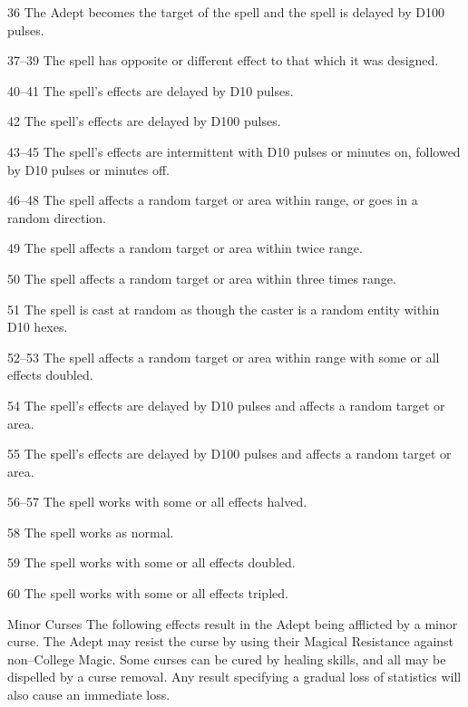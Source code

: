 \begin{multicols}{3}
\begin{Description}
\item[36] The Adept becomes the target of the spell and the spell is
delayed by D100 pulses.

\item[37--39] The spell has opposite or different effect to that which
it was designed.

\item[40--41] The spell's effects are delayed by D10 pulses.

\item[42] The spell's effects are delayed by D100 pulses.

\item[43--45] The spell's effects are intermittent with D10 pulses or
minutes on, followed by D10 pulses or minutes off.

\item[46--48] The spell affects a random target or area within range,
or goes in a random direction.

\item[49] The spell affects a random target or area within twice range.

\item[50] The spell affects a random target or area within three times
range.

\item[51] The spell is cast at random as though the caster is a random
entity within D10 hexes.

\item[52--53] The spell affects a random target or area within range
with some or all effects doubled.

\item[54] The spell's effects are delayed by D10 pulses and affects a
random target or area.

\item[55] The spell's effects are delayed by D100 pulses and affects a
random target or area.

\item[56--57] The spell works with some or all effects halved.

\item[58] The spell works as normal.

\item[59] The spell works with some or all effects doubled.

\item[60] The spell works with some or all effects tripled.

\item[Minor Curses] The following effects result in the Adept being
afflicted by a minor curse.  The Adept may resist the curse by using
their Magical Resistance against non--College Magic.  Some curses can
be cured by healing skills, and all may be dispelled by a curse
removal.  Any result specifying a gradual loss of statistics will also
cause an immediate loss.


\end{Description}
\end{multicols}
